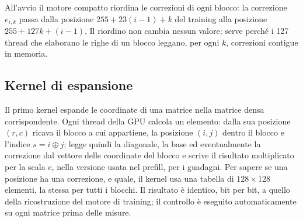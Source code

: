 All'avvio il motore compatto riordina le correzioni di ogni blocco: la correzione $e_{i,k}$ passa dalla posizione $255+23(i-1)+k$ del training alla posizione $255+127k+(i-1)$. Il riordino non cambia nessun valore; serve perché i 127 thread che elaborano le righe di un blocco leggano, per ogni $k$, correzioni contigue in memoria.

\subsection{Kernel di espansione}
\label{sec:kernel-rowmask}
Il primo kernel espande le coordinate di una matrice nella matrice densa corrispondente. Ogni thread della GPU calcola un elemento: dalla sua posizione $(r,c)$ ricava il blocco a cui appartiene, la posizione $(i,j)$ dentro il blocco e l'indice $s=i\oplus j$; legge quindi la diagonale, la base ed eventualmente la correzione dal vettore delle coordinate del blocco e scrive il risultato moltiplicato per la scala e, nella versione usata nel prefill, per i guadagni. Per sapere se una posizione ha una correzione, e quale, il kernel usa una tabella di $128\times128$ elementi, la stessa per tutti i blocchi. Il risultato è identico, bit per bit, a quello della ricostruzione del motore di training; il controllo è eseguito automaticamente su ogni matrice prima delle misure.

